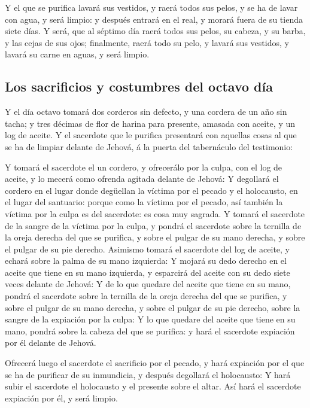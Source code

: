  Y el que se purifica lavará sus vestidos, y raerá todos
sus pelos, y se ha de lavar con agua, y será limpio: y después entrará
en el real, y morará fuera de su tienda siete días.  Y
será, que al séptimo día raerá todos sus pelos, su cabeza, y su barba, y
las cejas de sus ojos; finalmente, raerá todo su pelo, y lavará sus
vestidos, y lavará su carne en aguas, y será limpio.

\hypertarget{los-sacrificios-y-costumbres-del-octavo-duxeda}{%
\subsection{Los sacrificios y costumbres del octavo
día}\label{los-sacrificios-y-costumbres-del-octavo-duxeda}}

 Y el día octavo tomará dos corderos sin defecto, y una
cordera de un año sin tacha; y tres décimas de flor de harina para
presente, amasada con aceite, y un log de aceite.  Y el
sacerdote que le purifica presentará con aquellas cosas al que se ha de
limpiar delante de Jehová, á la puerta del tabernáculo del testimonio:

 Y tomará el sacerdote el un cordero, y ofrecerálo por la
culpa, con el log de aceite, y lo mecerá como ofrenda agitada delante de
Jehová:  Y degollará el cordero en el lugar donde
degüellan la víctima por el pecado y el holocausto, en el lugar del
santuario: porque como la víctima por el pecado, así también la víctima
por la culpa es del sacerdote: es cosa muy sagrada.  Y
tomará el sacerdote de la sangre de la víctima por la culpa, y pondrá el
sacerdote sobre la ternilla de la oreja derecha del que se purifica, y
sobre el pulgar de su mano derecha, y sobre el pulgar de su pie derecho.
 Asimismo tomará el sacerdote del log de aceite, y echará
sobre la palma de su mano izquierda:  Y mojará su dedo
derecho en el aceite que tiene en su mano izquierda, y esparcirá del
aceite con su dedo siete veces delante de Jehová:  Y de
lo que quedare del aceite que tiene en su mano, pondrá el sacerdote
sobre la ternilla de la oreja derecha del que se purifica, y sobre el
pulgar de su mano derecha, y sobre el pulgar de su pie derecho, sobre la
sangre de la expiación por la culpa:  Y lo que quedare
del aceite que tiene en su mano, pondrá sobre la cabeza del que se
purifica: y hará el sacerdote expiación por él delante de Jehová.

 Ofrecerá luego el sacerdote el sacrificio por el pecado,
y hará expiación por el que se ha de purificar de su inmundicia, y
después degollará el holocausto:  Y hará subir el
sacerdote el holocausto y el presente sobre el altar. Así hará el
sacerdote expiación por él, y será limpio.


